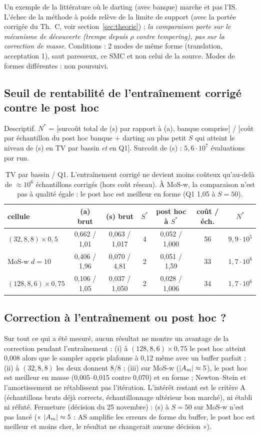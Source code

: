 \begin{verdict}Un exemple de la littérature où le darting (avec banque) marche et pas l'IS. L'échec de la méthode à poids relève de la limite de support (avec la portée corrigée du Th.~C, voir section~\ref{sec:theorie}) ; \emph{la comparaison porte sur le mécanisme de découverte (trempe depuis $\rho$ contre tempering), pas sur la correction de masse}. Conditions : 2 modes de même forme (translation, acceptation 1), saut paresseux, ce SMC et non celui de la source. Modes de formes différentes : non poursuivi.\end{verdict}

\subsection{Seuil de rentabilité de l'entraînement corrigé contre le post hoc}
Descriptif. $N^*$ = [surcoût total de (s) par rapport à (a), banque comprise] / [coût par échantillon du post hoc banque + darting au plus petit $S$ qui atteint le niveau de (s) en TV par bassin \emph{et} en Q1]. Surcoût de (s) : $5{,}6\cdot10^7$ évaluations par run.
\begin{table}[h]\centering\small
\begin{tabular}{lcccccc}\toprule
cellule & (a) brut & (s) brut & $S^*$ & post hoc à $S^*$ & coût / éch. & $N^*$\\\midrule
$(32,8,8)\times0{,}5$ & 0,662 / 1,01 & 0,063 / 1,017 & 4 & 0,052 / 1,000 & 56 & $9{,}9\cdot10^5$\\
MoS-w $d=10$ & 0,406 / 1,96 & 0,070 / 4,81 & 2 & 0,051 / 1,59 & 33 & $1{,}7\cdot10^6$\\
$(128,8,6)\times0{,}75$ & 0,106 / 1,05 & 0,037 / 1,050 & 2 & 0,028 / 1,006 & 34 & $1{,}7\cdot10^6$\\\bottomrule
\end{tabular}
\caption{TV par bassin / Q1. L'entraînement corrigé ne devient moins coûteux qu'au-delà de $\approx10^6$ échantillons corrigés (hors coût réseau). À MoS-w, la comparaison n'est pas à qualité égale : le post hoc est meilleur en forme (Q1 1,05 à $S=50$).}
\end{table}

\subsection{Correction à l'entraînement ou post hoc ?}
Sur tout ce qui a été mesuré, aucun résultat ne montre un avantage de la correction pendant l'entraînement : (i) à $(128,8,6)\times0{,}75$ le post hoc atteint 0,008 alors que le sampler appris plafonne à 0,12 même avec un buffer parfait ; (ii) à $(32,8,8)$ les deux donnent 8/8 ; (iii) sur MoS-w ($|A_m|\approx5$), le post hoc est meilleur en masse (0,005--0,015 contre 0,070) et en forme ; Newton--Stein et l'amortissement ne rétablissent pas l'itération. L'intérêt restant est le critère A (échantillons bruts déjà corrects, échantillonnage ultérieur bon marché), ni établi ni réfuté. Fermeture (décision du 25 novembre) : (s) à $S=50$ sur MoS-w n'est pas lancé (« $|A_m|\approx5$ : AS amplifie les erreurs de forme du buffer, le post hoc est meilleur et moins cher, le résultat ne changerait aucune décision »).
